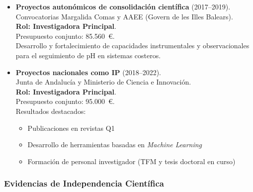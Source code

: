 \documentclass[11pt,a4paper]{article}
\begin{document}
\begin{itemize}[leftmargin=*]
    \item \textbf{Proyectos autonómicos de consolidación científica} (2017--2019).\\
    Convocatorias Margalida Comas y AAEE (Govern de les Illes Balears).\\
    \textbf{Rol: Investigadora Principal}.\\
    Presupuesto conjunto: 85.560~€.\\
    Desarrollo y fortalecimiento de capacidades instrumentales y observacionales para el seguimiento de pH en sistemas costeros.

    \item \textbf{Proyectos nacionales como IP} (2018--2022).\\
    Junta de Andalucía y Ministerio de Ciencia e Innovación.\\
    \textbf{Rol: Investigadora Principal}.\\
    Presupuesto conjunto: 95.000~€.\\
    Resultados destacados:
    \begin{itemize}
        \item Publicaciones en revistas Q1
        \item Desarrollo de herramientas basadas en \textit{Machine Learning}
        \item Formación de personal investigador (TFM y tesis doctoral en curso)
    \end{itemize}

\end{itemize}

\subsubsection{Evidencias de Independencia Científica}
\end{document}
